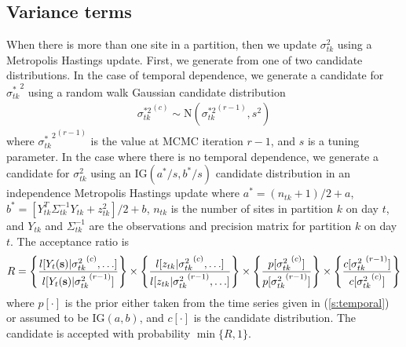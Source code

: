 \documentclass[11pt]{article}
\begin{document}
\subsection*{Variance terms}
When there is more than one site in a partition, then we update $\sigma^2_{tk}$ using a Metropolis Hastings update.
First, we generate from one of two candidate distributions.
In the case of temporal dependence, we generate a candidate for ${\sigma^*_{tk}}^2$ using a random walk Gaussian candidate distribution
\begin{align*}
  {\sigma^{*2}_{tk}}^{(c)} \sim \text{N}({\sigma^{*2}_{tk}}^{(r - 1)}, s^2)
\end{align*}
where ${{\sigma^*_{tk}}^2}^{(r - 1)}$ is the value at MCMC iteration $r - 1$, and $s$ is a tuning parameter.
In the case where there is no temporal dependence, we generate a candidate for $\sigma^2_{tk}$ using an IG$(a^*/s, b^*/s)$ candidate distribution in an independence Metropolis Hastings update where $a^* = (n_{tk} + 1) / 2 + a$, $b^* = [Y_{tk}^T \Sigma^{-1}_{tk} Y_{tk} + z_{tk}^2] / 2 + b$, $n_{tk}$ is the number of sites in partition $k$ on day $t$, and $Y_{tk}$ and $\Sigma^{-1}_{tk}$ are the observations and precision matrix for partition $k$ on day $t$.
The acceptance ratio is
\begin{align*}
  R = \left\{
    \frac{ l[Y_t(\mbox{\bf s}) | {\sigma^2_{tk}}^{(c)}, \ldots] }
         { l[Y_t(\mbox{\bf s}) | {\sigma^2_{tk}}^{(r - 1)}]}
    \right\} \times \left\{
    \frac{ l[z_{tk} | {\sigma^2_{tk}}^{(c)}, \ldots] }
         { l[z_{tk} | {\sigma^2_{tk}}^{(r - 1)}, \ldots] }
    \right\} \times \left\{
    \frac{ p[ {\sigma^2_{tk}}^{(c)} ] }
         { p[ {\sigma^2_{tk}}^{(r - 1)}] }
    \right\} \times \left\{
    \frac{ c[ {\sigma^2_{tk}}^{(r - 1)}] }
         { c[ {\sigma^2_{tk}}^{(c)}]}
    \right\}
\end{align*}
where $p[\cdot]$ is the prior either taken from the time series given in (\ref{s:temporal}) or assumed to be IG$(a, b)$, and $c[\cdot]$ is the candidate distribution.
The candidate is accepted with probability $\min\{R, 1\}$.
\end{document}
